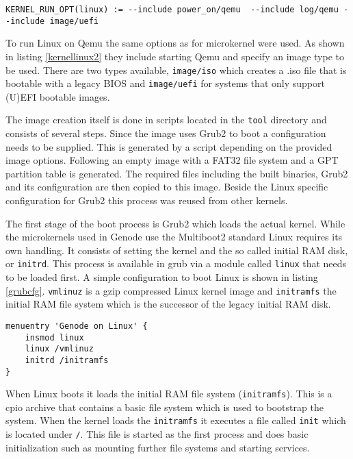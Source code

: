 \documentclass[
a4paper,
12pt,
notitlepage,
parskip=half,
DIV=11,
]{scrbook}
\begin{document}
		\begin{lstlisting}[basicstyle=\ttfamily\footnotesize]
KERNEL_RUN_OPT(linux) := --include power_on/qemu  --include log/qemu --include image/uefi
		\end{lstlisting}
		
		To run Linux on Qemu the same options as for microkernel were used.
		As shown in listing \ref{kernellinux2} they include starting Qemu and specify an image type to be used.
		There are two types available, \texttt{image/iso} which creates a .iso file that is bootable with a legacy BIOS and \texttt{image/uefi} for systems that only support (U)EFI bootable images.
		
		The image creation itself is done in scripts located in the \texttt{tool} directory and consists of several steps.
		Since the image uses Grub2 to boot a configuration needs to be supplied.
		This is generated by a script depending on the provided image options.
		Following an empty image with a FAT32 file system and a GPT partition table is generated.
		The required files including the built binaries, Grub2 and its configuration are then copied to this image.
		Beside the Linux specific configuration for Grub2 this process was reused from other kernels.
		
		
		The first stage of the boot process is Grub2 which loads the actual kernel.
		While the microkernels used in Genode use the Multiboot2 standard Linux requires its own handling.
		It consists of setting the kernel and the so called initial RAM disk, or \texttt{initrd}.
		This process is available in grub via a module called \texttt{linux} that needs to be loaded first.
		A simple configuration to boot Linux is shown in listing \ref{grubcfg}.
		\texttt{vmlinuz} is a gzip compressed Linux kernel image and \texttt{initramfs} the initial RAM file system which is the successor of the legacy initial RAM disk.
		
		\begin{lstlisting}[basicstyle=\ttfamily\footnotesize]
menuentry 'Genode on Linux' {
	insmod linux
	linux /vmlinuz
	initrd /initramfs
}
		\end{lstlisting}
		
		When Linux boots it loads the initial RAM file system (\texttt{initramfs}).
		This is a cpio archive that contains a basic file system which is used to bootstrap the system.
		When the kernel loads the \texttt{initramfs} it executes a file called \texttt{init} which is located under \texttt{/}.
		This file is started as the first process and does basic initialization such as mounting further file systems and starting services.
		
\end{document}
